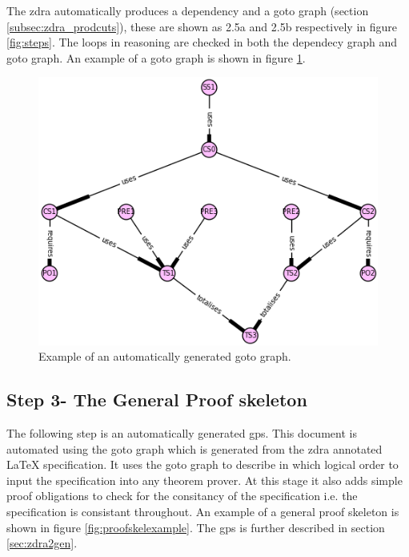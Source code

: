 The \gls{zdra} automatically produces a dependency and a goto graph (section \ref{subsec:zdra_prodcuts}), these are shown as 2.5a and 2.5b respectively in figure \ref{fig:steps}. The loops in reasoning are checked in both the dependecy graph and goto graph. An example of a goto graph is shown in figure \ref{fig:gotoexamplee}.

\begin{figure}[H]
 \begin{center}
 \includegraphics [scale=0.4]{Figures/Design/goto.png}
 \caption{Example of an automatically generated goto graph.}
 \label{fig:gotoexamplee}
\end{center}
\end{figure} 

\subsection{Step 3- The General Proof skeleton}

The following step is an automatically generated \gls{gps}. This document is automated using the goto graph which is generated from the \gls{zdra} annotated \LaTeX{} specification. It uses the goto graph to describe in which logical order to input the specification into any theorem prover. At this stage it also adds simple proof obligations to check for the consitancy of the specification i.e. the specification is consistant throughout. An example of a general proof skeleton is shown in figure \ref{fig:proofskelexample}. The \gls{gps} is further described in section \ref{sec:zdra2gen}.

